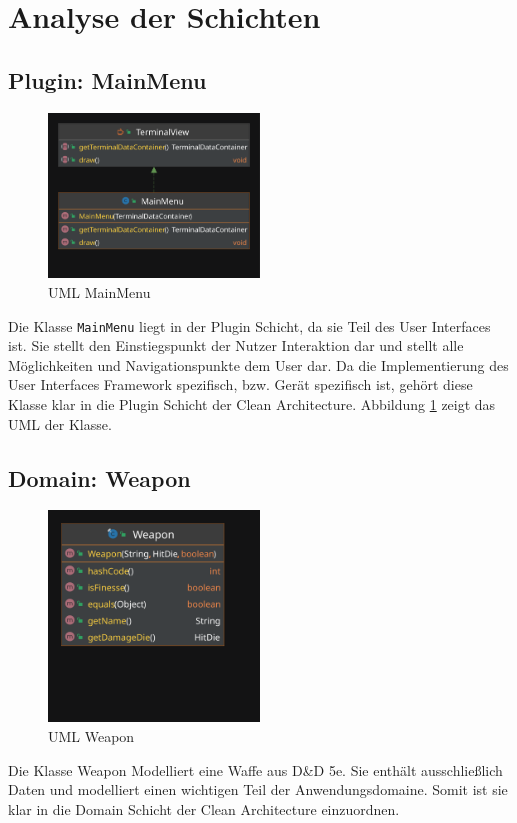 \section{Analyse der Schichten}

\subsection{Plugin: MainMenu}
\begin{figure}[H]
	\centering
	\includegraphics[width=0.5\textwidth]{Bilder/MainMenu.pdf}
	\caption{UML MainMenu}
	\label{fig:MainMenu}
\end{figure}

Die Klasse \texttt{MainMenu} liegt in der Plugin Schicht, da sie Teil des User Interfaces ist. Sie stellt den Einstiegspunkt der Nutzer Interaktion dar und stellt alle Möglichkeiten und Navigationspunkte dem User dar. Da die Implementierung des User Interfaces Framework spezifisch, bzw. Gerät spezifisch ist, gehört diese Klasse klar in die Plugin Schicht der Clean Architecture. Abbildung \ref{fig:MainMenu} zeigt das UML der Klasse.

\subsection{Domain: Weapon}
\begin{figure}[H]
	\centering
	\includegraphics[width=0.5\textwidth]{Bilder/Weapon.pdf}
	\caption{UML Weapon}
	\label{fig:Weapon}
\end{figure}
Die Klasse Weapon Modelliert eine Waffe aus D\&D 5e. Sie enthält ausschließlich Daten und modelliert einen wichtigen Teil der Anwendungsdomaine. Somit ist sie klar in die Domain Schicht der Clean Architecture einzuordnen.
